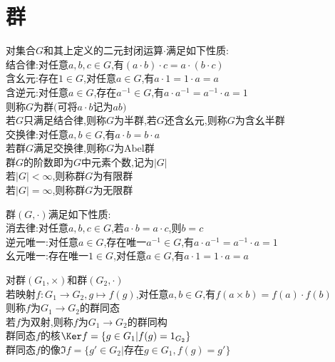 

%

\setcounter{section}{0}
\setcounter{subsection}{0}

\chapter{群}

\begin{dingyi}
对集合$G$和其上定义的二元封闭运算$\cdot$满足如下性质:\\
结合律:对任意$a,b,c\in G$,有$(a\cdot b)\cdot c=a\cdot (b\cdot c)$\\
含幺元:存在$1\in G$,对任意$a\in G$,有$a\cdot 1=1\cdot a=a$\\
含逆元:对任意$a\in G$,存在$a^{-1}\in G$,有$a\cdot a^{-1}=a^{-1}\cdot a=1$\\
则称$G$为群$($可将$a\cdot b$记为$ab$$)$\\
若$G$只满足结合律,则称$G$为半群,若$G$还含幺元,则称$G$为含幺半群\\
交换律:对任意$a,b\in G$,有$a\cdot b=b\cdot a$\\
若群$G$满足交换律,则称$G$为Abel群\\
群$G$的阶数即为$G$中元素个数,记为$|G|$\\
若$|G|<\infty$,则称群$G$为有限群\\
若$|G|=\infty$,则称群$G$为无限群
\end{dingyi}

\begin{zhu}
群$(G,\cdot)$满足如下性质:\\
消去律:对任意$a,b,c\in G$,若$a\cdot b=a\cdot c$,则$b=c$\\
逆元唯一:对任意$a\in G$,存在唯一$a^{-1}\in G$,有$a\cdot a^{-1}=a^{-1}\cdot a=1$\\
幺元唯一:存在唯一$1\in G$,对任意$a\in G$,有$a\cdot 1=1\cdot a=a$
\end{zhu}

\begin{dingyi}
对群$(G_1,\times)$和群$(G_2,\cdot)$\\
若映射$f:G_1\to G_2,g\mapsto f(g)$,对任意$a,b\in G$,有$f(a\times b)=f(a)\cdot f(b)$\\
则称$f$为$G_1\to G_2$的群同态\\
若$f$为双射,则称$f$为$G_1\to G_2$的群同构\\
群同态$f$的核$\Ker f=\{g\in G_1|f(g)=1_{G_2}\}$\\
群同态$f$的像$\Im f=\{g'\in G_2|\text{存在}g\in G_1,f(g)=g'\}$
\end{dingyi}

